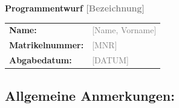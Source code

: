 \documentclass[a4paper,12pt]{article}
\newcommand{\placeholder}[1]{\textcolor{gray}{[#1]}}
\begin{document}
\begin{titlepage}
    \centering
    \vspace*{4cm}

    {\LARGE\bfseries Programmentwurf \placeholder{Bezeichnung}\par}

    \vspace{3cm}

    \begin{tabular}{ll}
        \textbf{Name:}           & \placeholder{Name, Vorname} \\[0.5em]
        \textbf{Matrikelnummer:} & \placeholder{MNR}           \\[0.5em]
        \textbf{Abgabedatum:}    & \placeholder{DATUM}
    \end{tabular}
\end{titlepage}

\newpage
\subsection*{Allgemeine Anmerkungen:}
\end{document}
